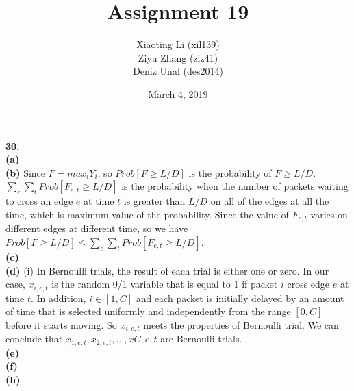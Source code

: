 \documentclass{article}
\title{Assignment 19}
\author{Xiaoting Li (xil139) \\
Ziyu Zhang (ziz41) \\
Deniz Unal (des2014)}
\date{March 4, 2019}
\begin{document}
\maketitle

\noindent
\textbf{30.} \\ \newline
\textbf{(a)} \\ \newline
\textbf{(b)} Since $F = max_iY_i$, so $Prob[F \geq L/D]$ is the probability of $F \geq L/D$. $\sum_e\sum_tProb[F_{e,t} \geq L/D]$ is the probability when the number of packets waiting to cross an edge $e$ at time $t$ is greater than $L/D$ on all of the edges at all the time, which is maximum value of the probability. Since the value of $F_{e,t}$ varies on different edges at different time, so we have $Prob[F \geq L/D] \leq \sum_e\sum_tProb[F_{e,t} \geq L/D]$.\\ \newline
\textbf{(c)}\\ \newline
\textbf{(d)} (i) In Bernoulli trials, the result of each trial is either one or zero. In our case, $x_{i,e,t}$ is the random 0/1 variable that is equal to 1 if packet $i$ cross edge $e
$ at time $t$. In addition, $i\in [1, C]$ and each packet is initially delayed by an amount of time that is selected uniformly and independently from the range $[0,C]$ before it starts moving. So $x_{i,e,t}$ meets the properties of Bernoulli trial. We can conclude that $x_{1,e,t}, x_{2,e,t}, ... , x{C,e,t}$ are Bernoulli trials.\\ \newline
\textbf{(e)} \\ \newline
\textbf{(f)} \\ \newline
\textbf{(h)} \\ \newline
\end{document}
